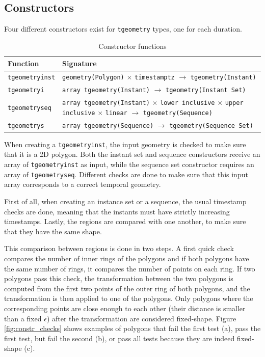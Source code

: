 \subsection{Constructors}
\label{section:constructors}

Four different constructors exist for \lstinline+tgeometry+ types, one for each duration.

\begin{table}[htb]
    \centering
    \begin{tabularx}{\textwidth}{|l|X|}
    \hline
    \textbf{Function}   & \textbf{Signature} \\ 
    \hline
    \lstinline+tgeometryinst+       & \lstinline+geometry(Polygon)+ $\times$ \lstinline+timestamptz+ $\rightarrow$ \lstinline+tgeometry(Instant)+ \\
    \hline
    \lstinline+tgeometryi+          & \lstinline+array tgeometry(Instant)+ $\rightarrow$ \lstinline+tgeometry(Instant Set)+ \\
    \hline
    \lstinline+tgeometryseq+        & \lstinline+array tgeometry(Instant)+ $\times$ \lstinline+lower inclusive+ $\times$ \lstinline+upper inclusive+ $\times$ \lstinline+linear+ $\rightarrow$ \lstinline+tgeometry(Sequence)+ \\
    \hline
    \lstinline+tgeometrys+          & \lstinline+array tgeometry(Sequence)+ $\rightarrow$ \lstinline+tgeometry(Sequence Set)+ \\
    \hline
    \end{tabularx}
    \caption{Constructor functions}
    \label{table:constructor_funcs}
\end{table}

When creating a \lstinline+tgeometryinst+, the input geometry is checked to make sure that it is a 2D polygon. Both the instant set and sequence constructors receive an array of \lstinline+tgeometryinst+ as input, while the sequence set constructor requires an array of \lstinline+tgeometryseq+. Different checks are done to make sure that this input array corresponds to a correct temporal geometry.

First of all, when creating an instance set or a sequence, the usual timestamp checks are done, meaning that the instants must have strictly increasing timestamps. Lastly, the regions are compared with one another, to make sure that they have the same shape.

This comparison between regions is done in two steps. A first quick check compares the number of inner rings of the polygons and if both polygons have the same number of rings, it compares the number of points on each ring. If two polygons pass this check, the transformation between the two polygons is computed from the first two points of the outer ring of both polygons, and the transformation is then applied to one of the polygons. Only polygons where the corresponding points are close enough to each other (their distance is smaller than a fixed $\epsilon$) after the transformation are considered fixed-shape. Figure \ref{fig:constr_checks} shows examples of polygons that fail the first test (a), pass the first test, but fail the second (b), or pass all tests because they are indeed fixed-shape (c).

